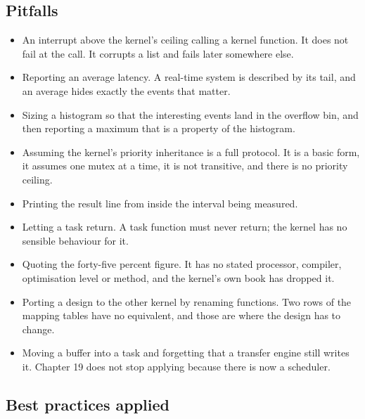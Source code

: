 \subsection*{Pitfalls}

\begin{itemize}
\item An interrupt above the kernel's ceiling calling a kernel function. It
does not fail at the call. It corrupts a list and fails later somewhere else.
\item Reporting an average latency. A real-time system is described by its
tail, and an average hides exactly the events that matter.
\item Sizing a histogram so that the interesting events land in the overflow
bin, and then reporting a maximum that is a property of the histogram.
\item Assuming the kernel's priority inheritance is a full protocol. It is a
basic form, it assumes one mutex at a time, it is not transitive, and there is
no priority ceiling.
\item Printing the result line from inside the interval being measured.
\item Letting a task return. A task function must never return; the kernel has
no sensible behaviour for it.
\item Quoting the forty-five percent figure. It has no stated processor,
compiler, optimisation level or method, and the kernel's own book has dropped
it.
\item Porting a design to the other kernel by renaming functions. Two rows of
the mapping tables have no equivalent, and those are where the design has to
change.
\item Moving a buffer into a task and forgetting that a transfer engine still
writes it. Chapter 19 does not stop applying because there is now a scheduler.
\end{itemize}

\subsection*{Best practices applied}

